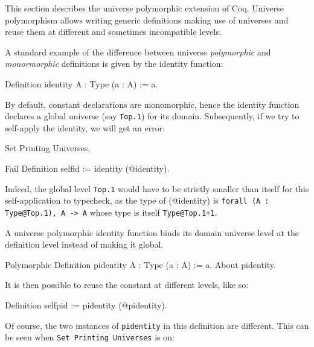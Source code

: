 
\label{Universes-full}


This section describes the universe polymorphic extension of Coq.
Universe polymorphism allows writing generic definitions making use of
universes and reuse them at different and sometimes incompatible levels.

A standard example of the difference between universe \emph{polymorphic} and 
\emph{monormorphic} definitions is given by the identity function:

\begin{coq_example*}
Definition identity {A : Type} (a : A) := a.
\end{coq_example*}

By default, constant declarations are monomorphic, hence the identity
function declares a global universe (say \texttt{Top.1}) for its
domain. Subsequently, if we try to self-apply the identity, we will get
an error:

\begin{coq_eval}
Set Printing Universes.
\end{coq_eval}
\begin{coq_example}
Fail Definition selfid := identity (@identity).
\end{coq_example}

Indeed, the global level \texttt{Top.1} would have to be strictly smaller than itself
for this self-application to typecheck, as the type of (@identity) is
\texttt{forall (A : Type@{Top.1}), A -> A} whose type is itself \texttt{Type@{Top.1+1}}.

A universe polymorphic identity function binds its domain universe level
at the definition level instead of making it global.

\begin{coq_example}
Polymorphic Definition pidentity {A : Type} (a : A) := a.
About pidentity.
\end{coq_example}

It is then possible to reuse the constant at different levels, like so:

\begin{coq_example}
Definition selfpid := pidentity (@pidentity).
\end{coq_example}

Of course, the two instances of \texttt{pidentity} in this definition
are different. This can be seen when \texttt{Set Printing Universes} is
on:

